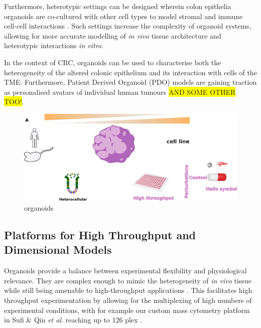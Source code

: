 Furthermore, heterotypic settings can be designed wherein colon epithelia organoids are co-cultured with other cell types to model stromal and immune cell-cell interactions \cite{qin_cell-type-specific_2020}. Such settings increase the complexity of organoid systems, allowing for more accurate modelling of \emph{in vivo} tissue architecture and heterotypic interactions \emph{in vitro}. 

In the context of CRC, organoids can be used to characterise both the heterogeneity of the altered colonic epithelium and its interaction with cells of the TME. Furthermore, Patient Derived Organoid (PDO) models are gaining traction as personalised avatars of individual human tumours \cite{zapatero_trellis_2023} \colorbox{yellow}{AND SOME OTHER TOO!}.

\begin{figure}
    \centering
    \includegraphics{01intro/figs/1BIO_organoids.png}
    \caption{organoids}
    \label{fig:fig3}
\end{figure}

\subsection{Platforms for High Throughput and Dimensional Models}

Organoids provide a balance between experimental flexibility and physiological relevance. They are complex enough to mimic the heterogeneity of \emph{in vivo} tissue while still being amenable to high-throughput applications \cite{qin_deciphering_2020}. This facilitates high throughput experimentation by allowing for the multiplexing of high numbers of experimental conditions, with for example our custom mass cytometry platform in Sufi \& Qin \textit{et al}. reaching up to 126 plex \cite{sufi_multiplexed_2021}.

